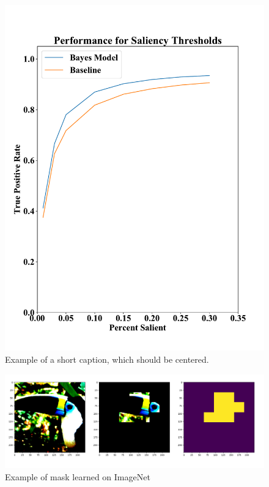 \documentclass[10pt,twocolumn,letterpaper]{article}
\begin{document}
\begin{figure}
\begin{center}
\includegraphics[width=\columnwidth]{figures/tpr.pdf}

\end{center}
   \caption{Example of a short caption, which should be centered.}
\label{fig:tpr}
\end{figure}


\begin{figure}
	\begin{center}
		\includegraphics[width=\columnwidth]{figures/bird_mask_predict.png}
		
	\end{center}
	\caption{Example of mask learned on ImageNet}
	\label{fig:short}
\end{figure}
\end{document}
